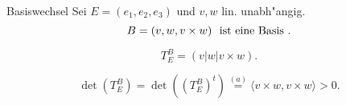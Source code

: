 \documentclass[class=article, crop=false]{standalone}
\begin{document}
\begin{zettel}{Basiswechsel}
    Sei $E = (e_1 , e_2, e_3 )$ und $v,w$ lin. unabh"angig.
    \[
         B = (v,w, v \times w) \tx{ ist eine Basis} 
    .\]

    \[
        T^B_{E} = (v|w|v \times w)
    .\]

    \[
        \det(T^B_E ) = \det((T^{B}_E )^t ) \stackrel{(a)}{=}  \langle v \times w, v \times w\rangle  > 0
    .\]
\end{zettel}
\end{document}
